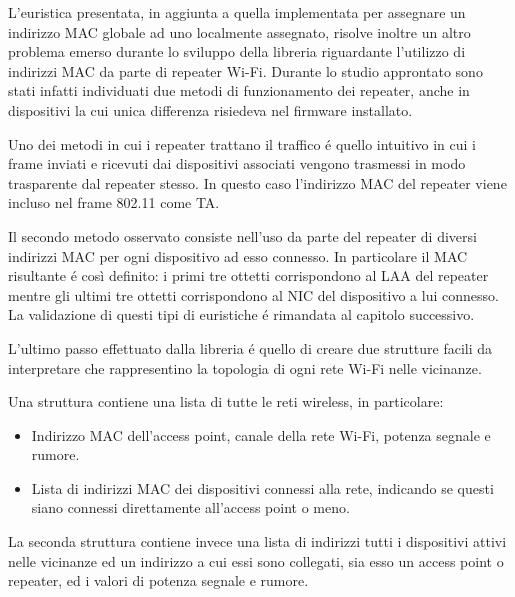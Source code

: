 L'euristica presentata, in aggiunta a quella implementata per assegnare un indirizzo MAC globale ad uno localmente assegnato, risolve inoltre un altro problema emerso durante lo sviluppo della libreria riguardante l'utilizzo di indirizzi MAC da parte di repeater Wi-Fi.
Durante lo studio approntato sono stati infatti individuati due metodi di funzionamento dei repeater, anche in dispositivi la cui unica differenza risiedeva nel firmware installato.

Uno dei metodi in cui i repeater trattano il traffico \'e quello intuitivo in cui i frame inviati e ricevuti dai dispositivi associati vengono trasmessi in modo trasparente dal repeater stesso.
In questo caso l'indirizzo MAC del repeater viene incluso nel frame 802.11 come TA.

Il secondo metodo osservato consiste nell'uso da parte del repeater di diversi indirizzi MAC per ogni dispositivo ad esso connesso.
In particolare il MAC risultante \'e cos\`i definito: i primi tre ottetti corrispondono al LAA del repeater mentre gli ultimi tre ottetti corrispondono al NIC del dispositivo a lui connesso.
La validazione di questi tipi di euristiche \'e rimandata al capitolo successivo.

L'ultimo passo effettuato dalla libreria \'e quello di creare due strutture facili da interpretare che rappresentino la topologia di ogni rete Wi-Fi nelle vicinanze.

Una struttura contiene una lista di tutte le reti wireless, in particolare:

\begin{itemize}
	\item Indirizzo MAC dell'access point, canale della rete Wi-Fi, potenza segnale e rumore.
	\item Lista di indirizzi MAC dei dispositivi connessi alla rete, indicando se questi siano connessi direttamente all'access point o meno.
\end{itemize}

La seconda struttura contiene invece una lista di indirizzi tutti i dispositivi attivi nelle vicinanze ed un indirizzo a cui essi sono collegati, sia esso un access point o repeater, ed i valori di potenza segnale e rumore.

